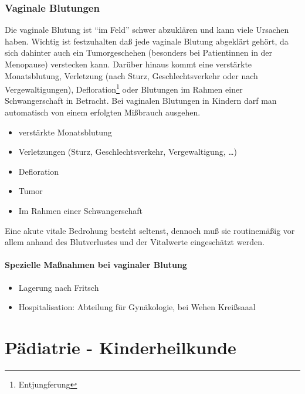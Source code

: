 \subsubsection{Vaginale Blutungen}

\gMarried
{Die vaginale Blutung ist "`im Feld"' schwer abzuklären und
kann viele Ursachen haben. Wichtig ist festzuhalten daß
jede vaginale Blutung abgeklärt gehört, da sich dahinter
auch ein Tumorgeschehen (besonders bei Patientinnen in der
Menopause) verstecken kann. Darüber hinaus kommt eine
verstärkte Monatsblutung, Verletzung (nach Sturz, 
Geschlechtsverkehr oder nach Vergewaltigungen),
Defloration\footnote{Entjungferung} oder Blutungen im Rahmen
einer Schwangerschaft in Betracht. Bei vaginalen Blutungen in Kindern darf man 
automatisch von einem erfolgten Mißbrauch ausgehen. }
{\begin{itemize}
    \item verstärkte Monatsblutung
    \item Verletzungen (Sturz, Geschlechtsverkehr, Vergewaltigung,
\ldots)
\item Defloration
\item Tumor
\item Im Rahmen einer Schwangerschaft
\end{itemize}}

Eine akute vitale Bedrohung besteht seltenst, dennoch muß
sie routinemäßig vor allem anhand des Blutverlustes und der
Vitalwerte eingeschätzt werden. 


\begin{gMassnahmenEnv}
    \paragraph{Spezielle Maßnahmen bei vaginaler Blutung}

\begin{itemize}
\item Lagerung nach Fritsch
\item Hospitalisation: Abteilung für
Gynäkologie, bei Wehen Kreißsaaal
\end{itemize}
\end{gMassnahmenEnv}





\clearpage

\section{Pädiatrie - Kinderheilkunde}

